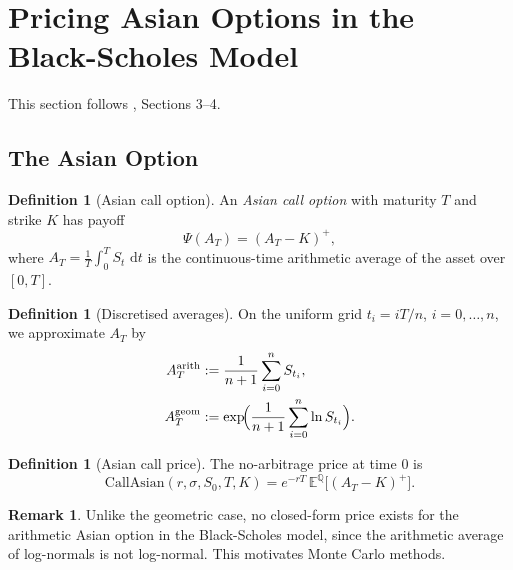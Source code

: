 \documentclass[11pt,a4paper]{article}
\theoremstyle{plain}
\theoremstyle{definition}
\newtheorem{definition}[theorem]{Definition}
\newtheorem{remark}[theorem]{Remark}
\newcommand{\E}{\mathbb{E}}
\newcommand{\Q}{\mathbb{Q}}
\newcommand{\dd}{\,\mathrm{d}}
\begin{document}
\section{Pricing Asian Options in the Black-Scholes Model}
\label{sec:asian}

This section follows \cite{kemna1990pricing}, Sections 3--4.

\subsection{The Asian Option}
\label{subsec:asian-def}

\begin{definition}[Asian call option]
An \emph{Asian call option} with maturity $T$ and strike $K$ has payoff
\begin{equation}
  \Psi(A_T) = (A_T - K)^+,
\end{equation}
where $A_T = \frac{1}{T}\int_0^T S_t \, \dd t$ is the continuous-time
arithmetic average of the asset over $[0,T]$.
\end{definition}

\begin{definition}[Discretised averages]
On the uniform grid $t_i = iT/n$, $i = 0,\ldots,n$, we approximate $A_T$ by
\begin{align}
  A_T^{\mathrm{arith}} &:= \frac{1}{n+1}\sum_{i=0}^{n} S_{t_i},
  \label{eq:arith} \\
  A_T^{\mathrm{geom}}  &:= \exp\!\Bigl(\frac{1}{n+1}\sum_{i=0}^{n}\ln S_{t_i}\Bigr).
  \label{eq:geom}
\end{align}
\end{definition}

\begin{definition}[Asian call price]
The no-arbitrage price at time $0$ is
\begin{equation}
  \mathrm{CallAsian}(r,\sigma,S_0,T,K)
  = e^{-rT}\,\E^{\Q}\!\bigl[(A_T - K)^+\bigr].
\end{equation}
\end{definition}

\begin{remark}
Unlike the geometric case, no closed-form price exists for the arithmetic
Asian option in the Black-Scholes model, since the arithmetic average of
log-normals is not log-normal. This motivates Monte Carlo methods.
\end{remark}
\end{document}
